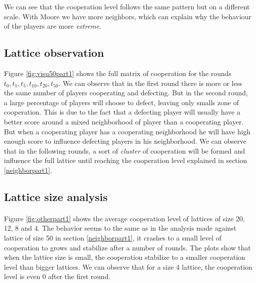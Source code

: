 \documentclass[letterpaper]{article}
\begin{document}
We can see that the cooperation level follows the same pattern but on a
different scale. With Moore we have more neighbors, which can explain
why the behaviour of the players are more \textit{extreme}.

\subsection{Lattice observation}

Figure \ref{fig:visu50part1} shows the full matrix of cooperation for
the rounds $t_{0}, t_{1}, t_{5}, t_{10}, t_{20}, t_{50}$. We can observe
that in the first round there is more or less the same number of players
cooperating and defecting. But in the second round, a large percentage
of players will choose to defect, leaving only smalls zone of cooperation.
This is due to the fact that a defecting player will usually have a better
score around a mixed neighborhood of player than a cooperating player.
But when a cooperating player has a cooperating neighborhood he will have
high enough score to influence defecting players in his neighborhood. We can
observe that in the following rounds, a sort of \textit{cluster} of cooperation
will be formed and influence the full lattice until reaching the cooperation
level explained in section \ref{neighborpart1}.



\subsection{Lattice size analysis}

\paragraph{}

Figure \ref{fig:otherpart1}  shows the average cooperation level
of lattices of size 20, 12, 8 and 4. The behavior seems to the same
as in the analysis made against lattice of size 50
in section \ref{neighborpart1}, it crashes to a small level of cooperation
to grows and stabilize after a number of rounds. The plots show that when
the lattice size is small, the cooperation stabilize to a smaller cooperation
level than bigger lattices. We can observe that for a size 4 lattice,
the cooperation level is even 0 after the first round.

\paragraph{}
\end{document}
